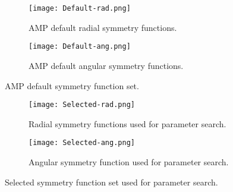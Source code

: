 \begin{figure}[H]
\begin{adjustbox}{max width=1.2\linewidth,center}
\centering
  \begin{subfigure}[b]{0.55\textwidth}
      \texttt{[image: Default-rad.png]}
      \caption{AMP default radial symmetry functions.}
    \label{fig:f1}
  \end{subfigure}
  \hfill
  \begin{subfigure}[b]{0.55\textwidth}
      \texttt{[image: Default-ang.png]}
      \caption{AMP default angular symmetry functions.}
    \label{fig:f2}
  \end{subfigure}
\end{adjustbox}
    \caption{AMP default symmetry function set.}
    \label{fig:default}
\end{figure}

\begin{figure}[H]
\begin{adjustbox}{max width=1.2\linewidth,center}
\centering
  \begin{subfigure}[b]{0.55\textwidth}
      \texttt{[image: Selected-rad.png]}
      \caption{Radial symmetry functions used for parameter search.}
    \label{fig:f1}
  \end{subfigure}
  \hfill
  \begin{subfigure}[b]{0.55\textwidth}
      \texttt{[image: Selected-ang.png]}
      \caption{Angular symmetry function used for parameter search.}
    \label{fig:f2}
  \end{subfigure}
\end{adjustbox}
    \caption{Selected symmetry function set used for parameter search.}
    \label{fig:selected}
\end{figure}

